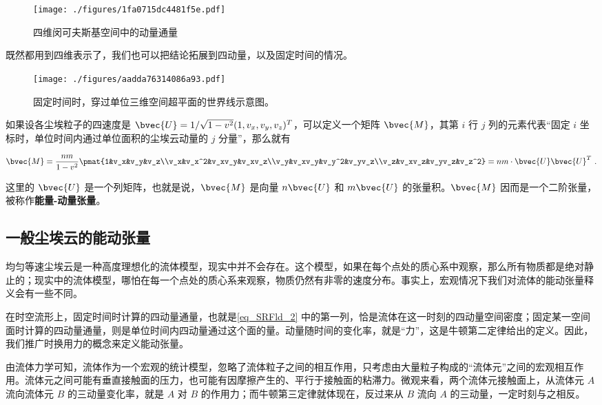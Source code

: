 \begin{figure}[ht]
\centering
\texttt{[image: ./figures/1fa0715dc4481f5e.pdf]}
\caption{四维闵可夫斯基空间中的动量通量} \label{fig_SRFld_2}
\end{figure}

既然都用到四维表示了，我们也可以把结论拓展到四动量，以及固定时间的情况。

\begin{figure}[ht]
\centering
\texttt{[image: ./figures/aadda76314086a93.pdf]}
\caption{固定时间时，穿过单位三维空间超平面的世界线示意图。} \label{fig_SRFld_3}
\end{figure}

如果设各尘埃粒子的四速度是 $\bvec{U}=1/\sqrt{1-v^2}(1, v_x, v_y, v_z)^T$，可以定义一个矩阵 $\bvec{M}$，其第 $i$ 行 $j$ 列的元素代表“固定 $i$ 坐标时，单位时间内通过单位面积的尘埃云动量的 $j$ 分量”，那么就有

\begin{equation}\label{eq_SRFld_2}
\bvec{M}=\frac{nm}{1-v^2}\pmat{1&v_x&v_y&v_z\\v_x&v_x^2&v_xv_y&v_xv_z\\v_y&v_xv_y&v_y^2&v_yv_z\\v_z&v_xv_z&v_yv_z&v_z^2}=nm\cdot\bvec{U}\bvec{U}^T~.
\end{equation}

这里的 $\bvec{U}$ 是一个列矩阵，也就是说，$\bvec{M}$ 是向量 $n\bvec{U}$ 和 $m\bvec{U}$ 的张量积。$\bvec{M}$ 因而是一个二阶张量，被称作\textbf{能量-动量张量}。


\subsection{一般尘埃云的能动张量}

均匀等速尘埃云是一种高度理想化的流体模型，现实中并不会存在。这个模型，如果在每个点处的质心系中观察，那么所有物质都是绝对静止的；现实中的流体模型，哪怕在每一个点处的质心系来观察，物质仍然有非零的速度分布。事实上，宏观情况下我们对流体的能动张量释义会有一些不同。

在时空流形上，固定时间时计算的四动量通量，也就是\autoref{eq_SRFld_2} 中的第一列，恰是流体在这一时刻的四动量空间密度；固定某一空间面时计算的四动量通量，则是单位时间内四动量通过这个面的量。动量随时间的变化率，就是“力”，这是牛顿第二定律给出的定义。因此，我们推广时换用力的概念来定义能动张量。

由流体力学可知，流体作为一个宏观的统计模型，忽略了流体粒子之间的相互作用，只考虑由大量粒子构成的“流体元”之间的宏观相互作用。流体元之间可能有垂直接触面的压力，也可能有因摩擦产生的、平行于接触面的粘滞力。微观来看，两个流体元接触面上，从流体元 $A$ 流向流体元 $B$ 的三动量变化率，就是 $A$ 对 $B$ 的作用力；而牛顿第三定律就体现在，反过来从 $B$ 流向 $A$ 的三动量，一定时刻与之相反。

